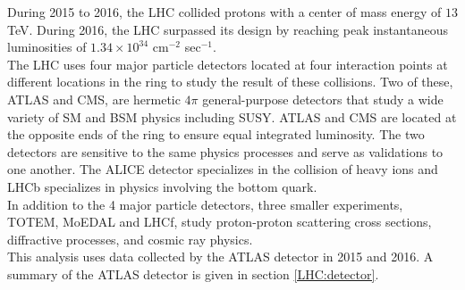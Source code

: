 \indent During 2015 to 2016, the LHC collided protons with a center of mass energy of $13$ TeV.  During 2016, the LHC surpassed its design by reaching peak instantaneous luminosities of $1.34 \times 10^{34}$ cm$^{-2}$ sec$^{-1}$.  \\

\indent The LHC uses four major particle detectors located at four interaction points at different locations in the ring to study the result of these collisions.  Two of these, ATLAS and CMS, are hermetic  $4\pi$ general-purpose detectors that study a wide variety of SM and BSM physics including SUSY.   ATLAS and CMS are located at the opposite ends of the ring to ensure equal integrated luminosity.  The two detectors are sensitive to the same physics processes and serve as validations to one another.  The ALICE detector specializes in the collision of heavy ions and LHCb specializes in physics involving the bottom quark. \\

\indent In addition to the 4 major particle detectors, three smaller experiments, TOTEM, MoEDAL and LHCf, study proton-proton scattering cross sections, diffractive processes, and cosmic ray physics.  ~\\

\indent This analysis uses data collected by the ATLAS detector in 2015 and 2016.  A summary of the ATLAS detector is given in section \ref{LHC:detector}. \\



